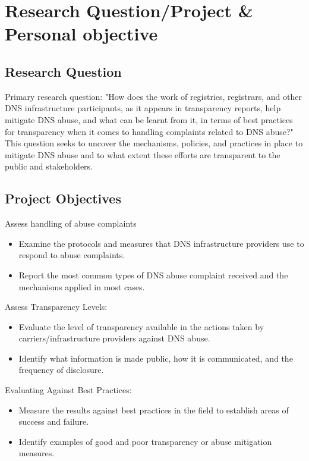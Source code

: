 \section{Research Question/Project \& Personal objective} 
\subsection{Research Question}

Primary research question: "How does the work of registries, registrars, and other DNS infrastructure participants, as it appears in transparency reports, help mitigate DNS abuse, and what can be learnt from it, in terms of best practices for transparency when it comes to handling complaints related to DNS abuse?" This question seeks to uncover the mechanisms, policies, and practices in place to mitigate DNS abuse and to what extent these efforts are transparent to the public and stakeholders.

\subsection{Project Objectives}

Assess handling of abuse complaints

\begin{itemize}
  \item Examine the protocols and measures that DNS infrastructure providers use to respond to abuse complaints.
  \item Report the most common types of DNS abuse complaint received and the mechanisms applied in most cases.
\end{itemize}

Assess Transparency Levels:

\begin{itemize}
  \item Evaluate the level of transparency available in the actions taken by carriers/infrastructure providers against DNS abuse.
  \item Identify what information is made public, how it is communicated, and the frequency of disclosure.
\end{itemize}

Evaluating Against Best Practices:

\begin{itemize}
  \item Measure the results against best practices in the field to establish areas of success and failure. 
  \item Identify examples of good and poor transparency or abuse mitigation measures.
\end{itemize}

